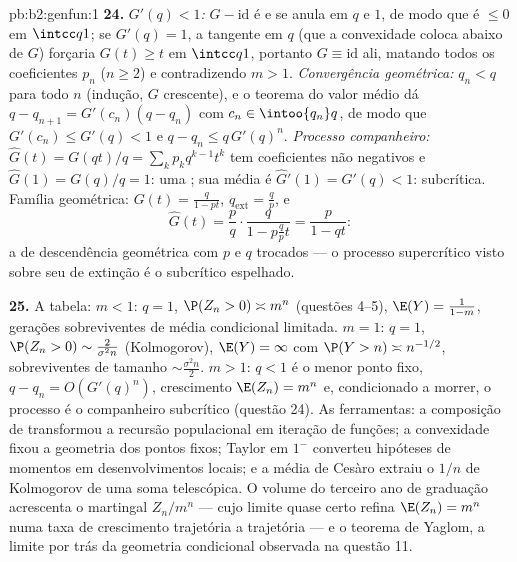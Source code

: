 \begin{solution}{pb:b2:genfun:1}
\textbf{24.} \emph{$G'(q) < 1$:} $G - \mathrm{id}$ é 
e se anula em $q$ e $1$, de modo que é $\leq 0$ em $\intcc
q1$; se $G'(q) = 1$, a tangente em $q$ (que a convexidade
coloca abaixo de $G$) forçaria $G(t) \geq t$ em $\intcc q1$,
portanto $G \equiv \mathrm{id}$ ali, matando todos os coeficientes
$p_n$ ($n \geq 2$) e contradizendo $m > 1$. \emph{Convergência
geométrica:} $q_n < q$ para todo $n$ (indução, $G$
crescente), e o teorema do valor médio dá $q - q_{n+1} =
G'(c_n)(q - q_n)$ com $c_n \in \intoo{q_n}q$, de modo que $G'(c_n)
\leq G'(q) < 1$ e $q - q_n \leq q\,G'(q)^n$.
\emph{Processo companheiro:} $\widehat G(t) = G(qt)/q =
\sum_kp_kq^{k-1}t^k$ tem coeficientes não negativos e
$\widehat G(1) = G(q)/q = 1$: uma ; sua média é $\widehat
G'(1) = G'(q) < 1$: subcrítica. Família geométrica: $G(t) =
\frac{q}{1-pt}$, $q_{\mathrm{ext}} = \frac qp$, e
\[
\widehat G(t) = \frac pq\cdot\frac{q}{1 - p\frac qp t}
= \frac{p}{1 - qt} :
\]
a  de descendência geométrica com $p$ e $q$ trocados ---
o processo supercrítico visto sobre seu  de extinção é o
subcrítico espelhado.

\textbf{25.} A tabela: $m < 1$: $q = 1$, $\P(Z_n > 0)
\asymp m^n$ (questões 4--5), $\E(Y) = \frac1{1-m}$,
gerações sobreviventes de média condicional limitada. $m = 1$:
$q = 1$, $\P(Z_n > 0) \sim \frac2{\sigma^2n}$ (Kolmogorov),
$\E(Y) = \infty$ com $\P(Y > n) \asymp n^{-1/2}$, sobreviventes
de tamanho $\sim \frac{\sigma^2n}2$. $m > 1$: $q < 1$ é o
menor ponto fixo, $q - q_n = O(G'(q)^n)$, crescimento
$\E(Z_n) = m^n$ e, condicionado a morrer, o processo é o
companheiro subcrítico (questão 24). As ferramentas: a composição
de  transformou a recursão populacional em iteração de funções;
a convexidade fixou a geometria dos pontos fixos; Taylor em
$1^-$ converteu hipóteses de momentos em desenvolvimentos locais; e
a média de Cesàro extraiu o $1/n$ de Kolmogorov de uma
soma telescópica. O volume do terceiro ano de graduação acrescenta o martingal $Z_n/
m^n$ --- cujo limite quase certo refina $\E(Z_n) = m^n$ numa
taxa de crescimento trajetória a trajetória --- e o teorema de
Yaglom, a  limite por trás da geometria condicional
observada na questão 11.
\end{solution}
